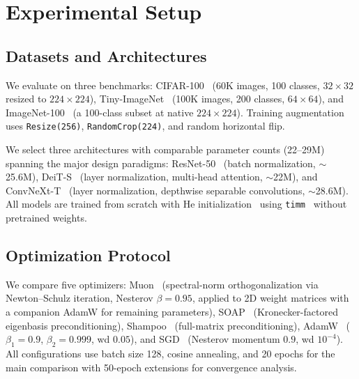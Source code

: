 \section{Experimental Setup}
\label{sec:experimental_setup}

\subsection{Datasets and Architectures}
\label{sec:datasets_archs}

We evaluate on three benchmarks: CIFAR-100~\cite{krizhevsky2009learning} (60K images, 100 classes, $32{\times}32$ resized to $224{\times}224$), Tiny-ImageNet~\cite{le2015tiny} (100K images, 200 classes, $64{\times}64$), and ImageNet-100~\cite{deng2009imagenet} (a 100-class subset at native $224{\times}224$). Training augmentation uses \texttt{Resize(256)}, \texttt{RandomCrop(224)}, and random horizontal flip.

We select three architectures with comparable parameter counts (22--29M) spanning the major design paradigms: ResNet-50~\cite{he2016deep} (batch normalization, $\sim$25.6M), DeiT-S~\cite{touvron2021training} (layer normalization, multi-head attention, $\sim$22M), and ConvNeXt-T~\cite{liu2022convnet} (layer normalization, depthwise separable convolutions, $\sim$28.6M). All models are trained from scratch with He initialization~\cite{he2015delving} using \texttt{timm}~\cite{rw2019timm} without pretrained weights.

\subsection{Optimization Protocol}
\label{sec:optim_protocol}

We compare five optimizers: Muon~\cite{jordan2024muon} (spectral-norm orthogonalization via Newton--Schulz iteration, Nesterov $\beta{=}0.95$, applied to 2D weight matrices with a companion AdamW for remaining parameters), SOAP~\cite{vyas2025soap} (Kronecker-factored eigenbasis preconditioning), Shampoo~\cite{gupta2018shampoo} (full-matrix preconditioning), AdamW~\cite{loshchilov2019decoupled} ($\beta_1{=}0.9$, $\beta_2{=}0.999$, wd $0.05$), and SGD~\cite{sutskever2013importance} (Nesterov momentum $0.9$, wd $10^{-4}$). All configurations use batch size 128, cosine annealing, and 20 epochs for the main comparison with 50-epoch extensions for convergence analysis.

